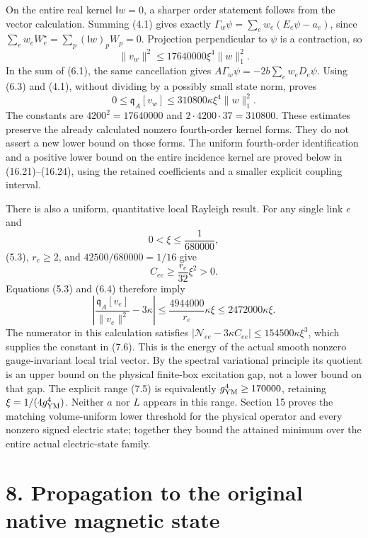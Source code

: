 \documentclass[
]{article}
\begin{document}
On the entire real kernel \(\mathsf Iw=0\), a sharper order statement
follows from the vector calculation. Summing (4.1) gives exactly
\(\Gamma_w\psi=\sum_ew_e(E_e\psi-a_e)\), since
\(\sum_ew_eW_e^{\star}=\sum_p(\mathsf Iw)_pW_p=0\). Projection
perpendicular to \(\psi\) is a contraction, so \[
\|v_w\|^2\le17640000\xi^4\|w\|_1^2.                          \tag{7.3}
\] In the sum of (6.1), the same cancellation gives
\(A\Gamma_w\psi=-2b\sum_ew_eD_e\psi\). Using (6.3) and (4.1), without
dividing by a possibly small state norm, proves \[
0\le\mathfrak q_A[v_w]\le310800\kappa\xi^4\|w\|_1^2.         \tag{7.4}
\] The constants are \(4200^2=17640000\) and
\(2\cdot4200\cdot37=310800\). These estimates preserve the already
calculated nonzero fourth-order kernel forms. They do not assert a new
lower bound on those forms. The uniform fourth-order identification and
a positive lower bound on the entire incidence kernel are proved below
in (16.21)--(16.24), using the retained coefficients and a smaller
explicit coupling interval.

There is also a uniform, quantitative local Rayleigh result. For any
single link \(e\) and \[
0<\xi\le\frac1{680000},                                      \tag{7.5}
\] (5.3), \(r_e\ge2\), and \(42500/680000=1/16\) give \[
C_{ee}\ge\frac{r_e}{32}\xi^2>0.
\] Equations (5.3) and (6.4) therefore imply \[
\left|\frac{\mathfrak q_A[v_e]}{\|v_e\|^2}-3\kappa\right|
 \le\frac{4944000}{r_e}\kappa\xi
 \le2472000\kappa\xi.                                       \tag{7.6}
\] The numerator in this calculation satisfies
\(|\mathcal N_{ee}-3\kappa C_{ee}|\le154500\kappa\xi^3\), which supplies
the constant in (7.6). This is the energy of the actual smooth nonzero
gauge-invariant local trial vector. By the spectral variational
principle its quotient is an upper bound on the physical finite-box
excitation gap, not a lower bound on that gap. The explicit range (7.5)
is equivalently \(g_{\rm YM}^4\ge170000\), retaining
\(\xi=1/(4g_{\rm YM}^4)\). Neither \(a\) nor \(L\) appears in this
range. Section 15 proves the matching volume-uniform lower threshold for
the physical operator and every nonzero signed electric state; together
they bound the attained minimum over the entire actual electric-state
family.

\section{8. Propagation to the original native magnetic
state}\label{propagation-to-the-original-native-magnetic-state}
\end{document}
